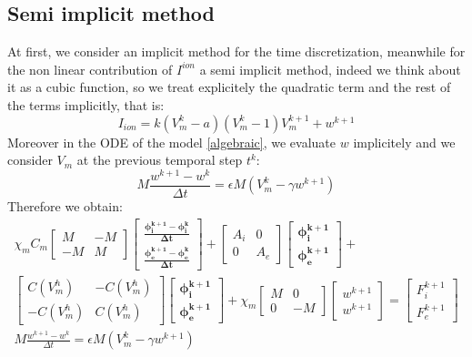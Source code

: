 \documentclass[a4paper,12pt]{article}
\begin{document}
\subsection{Semi implicit method}
At first, we consider an implicit method for the time discretization, meanwhile for the non linear contribution of $I^{ion}$ a semi implicit method, indeed we think about it as a cubic function, so we treat explicitely the quadratic term and the rest of the terms implicitly, that is:
\begin{equation*}
I_{ion}=k(V_m^k-a)(V_m^k-1)V_m^{k+1}+w^{k+1}
\end{equation*}
Moreover in the ODE of the model \ref{algebraic}, we evaluate $w$ implicitely and we consider $V_m$ at the previous temporal step $t^k$:
\begin{equation*}
M \frac{w^{k+1}-w^k}{\Delta t}=\epsilon M (V_m^k-\gamma w^{k+1})
\end{equation*}
\vspace{5mm}
Therefore we obtain:
\begin{equation}
 \begin{gathered}
 \chi_mC_m \begin{bmatrix}M &-M \\ -M & M \end{bmatrix}
	\begin{bmatrix}\bm{\frac{\phi_i^{k+1}-\phi_i^{k}}{\Delta t}} \\ \bm{\frac{\phi_e^{k+1}-\phi_e^{k}}{\Delta t}}  \end{bmatrix}
	 + \begin{bmatrix}A_i & 0 \\ 0 & A_e \end{bmatrix}
	 \begin{bmatrix}\bm{\phi_i^{k+1}} \\ \bm{\phi_e^{k+1}} \end{bmatrix} +\\
	   \begin{bmatrix}C(V_m^h) & -C(V_m^h) \\ -C(V_m^h) & C(V_m^h) \end{bmatrix} 
	   \begin{bmatrix} \bm{\phi_i^{k+1}} \\ \bm{\phi_e^{k+1}}  \end{bmatrix} 
	   +\chi_m \begin{bmatrix}M & 0 \\ 0 & -M \end{bmatrix} 
	   	\begin{bmatrix}w^{k+1} \\ w^{k+1} \end{bmatrix} = 
	   	\begin{bmatrix} F_i^{k+1} \\ F_e^{k+1}\end{bmatrix}\\
	   M \frac{w^{k+1}-w^k}{\Delta t}=\epsilon M (V_m^k-\gamma w^{k+1})
\end{gathered}
\end{equation}
\end{document}
